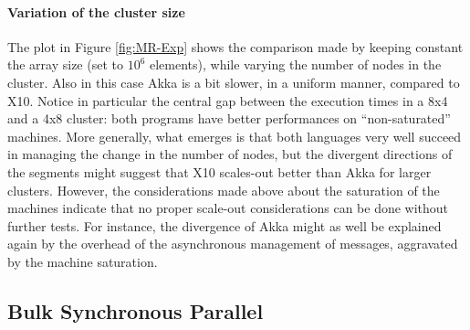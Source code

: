 \documentclass[a4paper]{article}
\numberwithin{equation}{section}
\begin{document}
\paragraph{Variation of the cluster size}
The plot in Figure \ref{fig:MR-Exp} shows the comparison 
made by keeping constant the array size (set to
$10^6$ elements), while varying the number of nodes
in the cluster. Also in this case Akka is a bit slower, in a
uniform manner, compared to X10.
Notice in particular the central gap between the execution times in
a 8x4 and a 4x8 cluster: both programs have better
performances on ``non-saturated'' machines.
More generally, what emerges is that
both languages very well succeed in managing the change in the number 
of nodes, but the divergent directions of the segments 
might suggest that X10 scales-out better than Akka for larger
clusters. 
However, the considerations made above about the saturation of the 
machines indicate that no proper scale-out considerations can be
done without further tests.
For instance, the divergence of Akka might as well be explained
again by the overhead of the asynchronous management of messages,
aggravated by the machine saturation.


\subsection{Bulk Synchronous Parallel}
\end{document}
